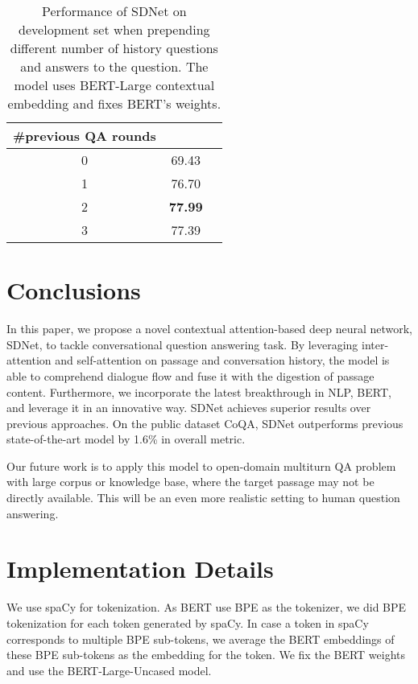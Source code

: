 \documentclass{article} \usepackage{sdnet,times}
\begin{document}
\begin{table}[h]
\centering
\caption{Performance of SDNet on development set when prepending different number of history questions and answers to the question. The model uses BERT-Large contextual embedding and fixes BERT's weights.}
\label{table:context}
\begin{tabular}{ccc}
\toprule
\#previous QA rounds  &  \\ \midrule
0 & 69.43 \\
1 & 76.70\\
2 & \textbf{77.99}\\
3 & 77.39\\
\bottomrule
\end{tabular}
\end{table}

\section{Conclusions}
\label{conclusion}
In this paper, we propose a novel contextual attention-based deep neural network, SDNet, to tackle conversational question answering task. By leveraging inter-attention and self-attention on passage and conversation history, the model is able to comprehend dialogue flow and fuse it with the digestion of passage content. Furthermore, we incorporate the latest breakthrough in NLP, BERT, and leverage it in an innovative way. SDNet achieves superior results over previous approaches. On the public dataset CoQA, SDNet outperforms previous state-of-the-art model by 1.6\% in overall  metric.

Our future work is to apply this model to open-domain multiturn QA problem with large corpus or knowledge base, where the target passage may not be directly available. This will be an even more realistic setting to human question answering.




\appendix \label{sec:appendix}
\section{Implementation Details}
We use spaCy for tokenization. As BERT use BPE as the tokenizer, we did BPE tokenization for each token generated by spaCy. In case a token in spaCy corresponds to multiple BPE sub-tokens, we average the BERT embeddings of these BPE sub-tokens as the embedding for the token. We fix the BERT weights and use the BERT-Large-Uncased model.
\end{document}
